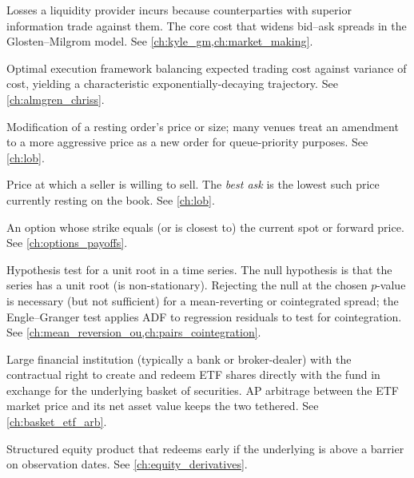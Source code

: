 \begin{description}
\setlength{\itemsep}{2pt}

\item[Adverse selection]
Losses a liquidity provider incurs because counterparties with superior
information trade against them. The core cost that widens bid--ask
spreads in the Glosten--Milgrom model. See \cref{ch:kyle_gm,ch:market_making}.

\item[Almgren--Chriss]
Optimal execution framework balancing expected trading cost against
variance of cost, yielding a characteristic exponentially-decaying
trajectory. See \cref{ch:almgren_chriss}.

\item[Amendment]
Modification of a resting order's price or size; many venues treat an
amendment to a more aggressive price as a new order for queue-priority
purposes. See \cref{ch:lob}.

\item[Ask (offer)]
Price at which a seller is willing to sell. The \emph{best ask} is the
lowest such price currently resting on the book. See \cref{ch:lob}.

\item[At-the-money (ATM)]
An option whose strike equals (or is closest to) the current spot or
forward price. See \cref{ch:options_payoffs}.

\item[Augmented Dickey--Fuller (ADF) test]
Hypothesis test for a unit root in a time series. The null hypothesis
is that the series has a unit root (is non-stationary). Rejecting the
null at the chosen $p$-value is necessary (but not sufficient) for a
mean-reverting or cointegrated spread; the Engle--Granger test applies
ADF to regression residuals to test for cointegration.
See \cref{ch:mean_reversion_ou,ch:pairs_cointegration}.

\item[Authorised participant (AP)]
Large financial institution (typically a bank or broker-dealer) with the
contractual right to create and redeem ETF shares directly with the fund
in exchange for the underlying basket of securities. AP arbitrage between
the ETF market price and its net asset value keeps the two tethered.
See \cref{ch:basket_etf_arb}.

\item[Autocallable]
Structured equity product that redeems early if the underlying is above
a barrier on observation dates. See \cref{ch:equity_derivatives}.


\end{description}

